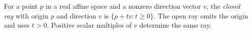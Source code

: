 
For a point $p$ in a real affine space and a nonzero direction vector $v$, the \emph{closed ray} with origin $p$ and direction $v$ is $\{p+tv:t\ge0\}$. The open ray omits the origin and uses $t>0$. Positive scalar multiples of $v$ determine the same ray.
